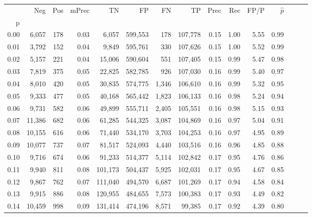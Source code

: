 \begin{tabular}{rrrrrrrrrrrrrrr}
\toprule
{} &     Neg &    Pos & mPrec &       TN &       FP &       FN &       TP &  Prec &   Rec &  FP/P & $\hat{p}$ \\
p    &         &        &       &          &          &          &          &       &       &       &           \\
\midrule
0.00 &   6,057 &    178 &  0.03 &    6,057 &  599,553 &      178 &  107,778 &  0.15 &  1.00 &  5.55 &      0.99 \\
0.01 &   3,792 &    152 &  0.04 &    9,849 &  595,761 &      330 &  107,626 &  0.15 &  1.00 &  5.52 &      0.99 \\
0.02 &   5,157 &    221 &  0.04 &   15,006 &  590,604 &      551 &  107,405 &  0.15 &  0.99 &  5.47 &      0.98 \\
0.03 &   7,819 &    375 &  0.05 &   22,825 &  582,785 &      926 &  107,030 &  0.16 &  0.99 &  5.40 &      0.97 \\
0.04 &   8,010 &    420 &  0.05 &   30,835 &  574,775 &    1,346 &  106,610 &  0.16 &  0.99 &  5.32 &      0.95 \\
0.05 &   9,333 &    477 &  0.05 &   40,168 &  565,442 &    1,823 &  106,133 &  0.16 &  0.98 &  5.24 &      0.94 \\
0.06 &   9,731 &    582 &  0.06 &   49,899 &  555,711 &    2,405 &  105,551 &  0.16 &  0.98 &  5.15 &      0.93 \\
0.07 &  11,386 &    682 &  0.06 &   61,285 &  544,325 &    3,087 &  104,869 &  0.16 &  0.97 &  5.04 &      0.91 \\
0.08 &  10,155 &    616 &  0.06 &   71,440 &  534,170 &    3,703 &  104,253 &  0.16 &  0.97 &  4.95 &      0.89 \\
0.09 &  10,077 &    737 &  0.07 &   81,517 &  524,093 &    4,440 &  103,516 &  0.16 &  0.96 &  4.85 &      0.88 \\
0.10 &   9,716 &    674 &  0.06 &   91,233 &  514,377 &    5,114 &  102,842 &  0.17 &  0.95 &  4.76 &      0.86 \\
0.11 &   9,940 &    811 &  0.08 &  101,173 &  504,437 &    5,925 &  102,031 &  0.17 &  0.95 &  4.67 &      0.85 \\
0.12 &   9,867 &    762 &  0.07 &  111,040 &  494,570 &    6,687 &  101,269 &  0.17 &  0.94 &  4.58 &      0.84 \\
0.13 &   9,915 &    886 &  0.08 &  120,955 &  484,655 &    7,573 &  100,383 &  0.17 &  0.93 &  4.49 &      0.82 \\
0.14 &  10,459 &    998 &  0.09 &  131,414 &  474,196 &    8,571 &   99,385 &  0.17 &  0.92 &  4.39 &      0.80 \\

\end{tabular}
